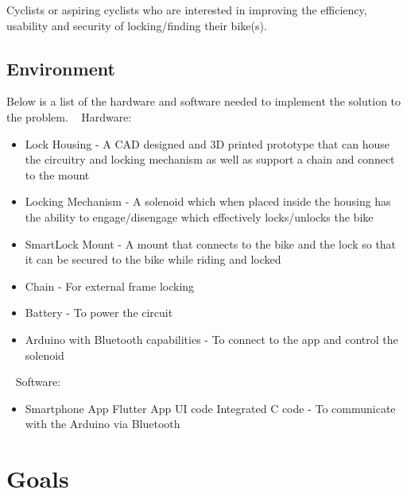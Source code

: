 \documentclass{article}
\begin{document}
Cyclists or aspiring cyclists who are interested in improving the efficiency, usability and security of locking/finding their bike(s).

\newpage
\subsection{Environment}

Below is a list of the hardware and software needed to implement the solution to the problem.
~\newline
Hardware:
\begin{itemize}
\item Lock Housing - A CAD designed and 3D printed prototype that can house the circuitry and locking mechanism as well as support a chain and connect to the mount
\item Locking Mechanism - A solenoid which when placed inside the housing has the ability to engage/disengage which effectively locks/unlocks the bike
\item SmartLock Mount - A mount that connects to the bike and the lock so that it can be secured to the bike while riding and locked
\item Chain - For external frame locking
\item Battery - To power the circuit
\item Arduino with Bluetooth capabilities - To connect to the app and control the solenoid
\end{itemize}

~\newline
Software: 
\begin{itemize}
\item Smartphone App
\subitem Flutter App UI code
\subitem Integrated C code - To communicate with the Arduino via Bluetooth
\end{itemize}

\newpage
\section{Goals}
\end{document}

